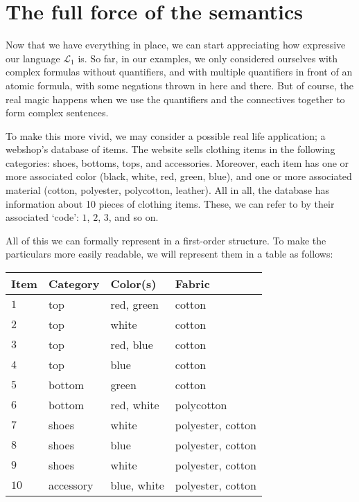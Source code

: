 \section{The full force of the semantics}

Now that we have everything in place, we can start appreciating how expressive our language $\mathcal{L}_1$ is. So far, in our examples, we only considered ourselves with complex formulas without quantifiers, and with multiple quantifiers in front of an atomic formula, with some negations thrown in here and there. But of course, the real magic happens when we use the quantifiers and the connectives together to form complex sentences. 

To make this more vivid, we may consider a possible real life application; a webshop's database of items. The website sells clothing items in the following categories: shoes, bottoms, tops, and accessories. Moreover, each item has one or more associated color (black, white, red, green, blue), and one or more associated material (cotton, polyester, polycotton, leather). All in all, the database has information about 10 pieces of clothing items. These, we can refer to by their associated `code': $1$, $2$, $3$, and so on. 

All of this we can formally represent in a first-order structure. To make the particulars more easily readable, we will represent them in a table as follows:

\begin{center}
\begin{tabular}{l|l|l|l}
\textbf{Item} & \textbf{Category} & \textbf{Color(s)} & \textbf{Fabric}\\\hline\hline
$1$ & top& red, green & cotton \\ \hline
$2$ & top& white & cotton \\ \hline
$3$ &top& red, blue & cotton \\\hline
$4$ & top& blue & cotton \\\hline
$5$ & bottom & green & cotton \\ \hline
$6$ & bottom & red, white & polycotton \\ \hline
$7$ & shoes& white & polyester, cotton \\\hline
$8$ & shoes& blue & polyester, cotton \\\hline 
$9$ & shoes& white &   polyester, cotton \\\hline
$10$ & accessory & blue, white & polyester, cotton  
\end{tabular}
\end{center}

